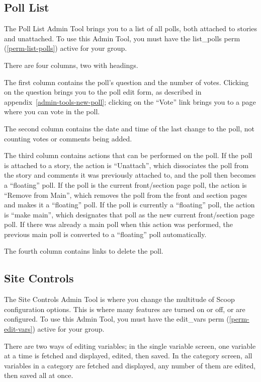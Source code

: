 \subsection{Poll List}
\label{admin-tools-poll-list}

The Poll List Admin Tool brings you to a list of all polls, both attached to stories and unattached.  To use this Admin Tool, you must have the list\_polls perm (\ref{perm-list-polls}) active for your group.

There are four columns, two with headings.

The first column contains the poll's question and the number of votes.  Clicking on the question brings you to the poll edit form, as described in appendix~\ref{admin-tools-new-poll}; clicking on the ``Vote'' link brings you to a page where you can vote in the poll.

The second column contains the date and time of the last change to the poll, not counting votes or comments being added.

The third column contains actions that can be performed on the poll.  If the poll is attached to a story, the action is ``Unattach'', which dissociates the poll from the story and comments it was previously attached to, and the poll then becomes a ``floating'' poll.  If the poll is the current front/section page poll, the action is ``Remove from Main'', which removes the poll from the front and section pages and makes it a ``floating'' poll.  If the poll is currently a ``floating'' poll, the action is ``make main'', which designates that poll as the new current front/section page poll.  If there was already a main poll when this action was performed, the previous main poll is converted to a ``floating'' poll automatically.

The fourth column contains links to delete the poll.

\subsection{Site Controls}
\label{admin-tools-vars}

The Site Controls Admin Tool is where you change the multitude of Scoop configuration options.  This is where many features are turned on or off, or are configured.  To use this Admin Tool, you must have the edit\_vars perm (\ref{perm-edit-vars}) active for your group.

There are two ways of editing variables; in the single variable screen, one variable at a time is fetched and displayed, edited, then saved.  In the category screen, all variables in a category are fetched and displayed, any number of them are edited, then saved all at once.


